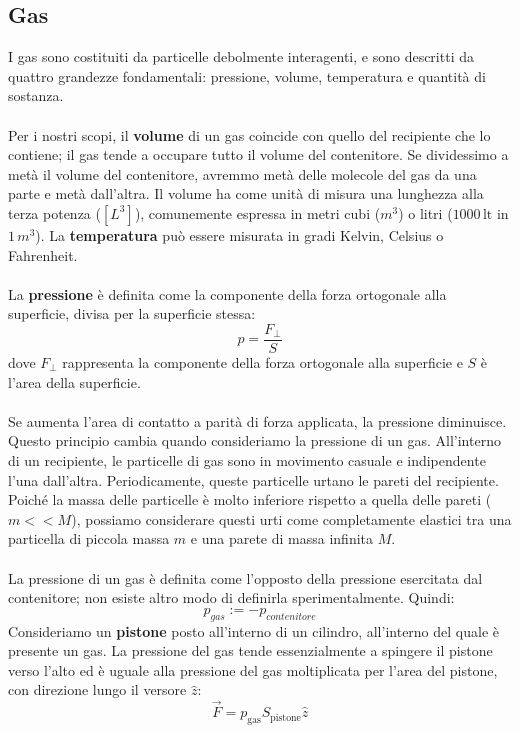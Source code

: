 \documentclass{article}
\begin{document}
\subsection{Gas}
I gas sono costituiti da particelle debolmente interagenti, e sono descritti da quattro grandezze fondamentali: pressione, volume, temperatura e quantità di sostanza.\\
\\
Per i nostri scopi, il \textbf{volume} di un gas coincide con quello del recipiente che lo contiene; il gas tende a occupare tutto il volume del contenitore. Se dividessimo a metà il volume del contenitore, avremmo metà delle molecole del gas da una parte e metà dall'altra. Il volume ha come unità di misura una lunghezza alla terza potenza (\([L^3]\)), comunemente espressa in metri cubi (\(m^3\)) o litri (\(1000 \, \text{lt}\) in \(1 \, m^3\)).
\newpage
\noindent La \textbf{temperatura} può essere misurata in gradi Kelvin, Celsius o Fahrenheit.\\
\\
La \textbf{pressione} è definita come la componente della forza ortogonale alla superficie, divisa per la superficie stessa:
\[
    p = \frac{F_{\bot}}{S}
\] 
dove \(F_{\bot}\) rappresenta la componente della forza ortogonale alla superficie e \(S\) è l'area della superficie.\\
\\
Se aumenta l'area di contatto a parità di forza applicata, la pressione diminuisce. Questo principio cambia quando consideriamo la pressione di un gas. All'interno di un recipiente, le particelle di gas sono in movimento casuale e indipendente l'una dall'altra. Periodicamente, queste particelle urtano le pareti del recipiente. Poiché la massa delle particelle è molto inferiore rispetto a quella delle pareti (\( m << M \)), possiamo considerare questi urti come completamente elastici tra una particella di piccola massa \( m \) e una parete di massa infinita \( M \).\\
\\
La pressione di un gas è definita come l'opposto della pressione esercitata dal contenitore; non esiste altro modo di definirla sperimentalmente. Quindi:
\[
    p_{gas} := -p_{contenitore}
\]
Consideriamo un \textbf{pistone} posto all'interno di un cilindro, all'interno del quale è presente un gas. La pressione del gas tende essenzialmente a spingere il pistone verso l'alto ed è uguale alla pressione del gas moltiplicata per l'area del pistone, con direzione lungo il versore \( \hat{z} \):
\[
    \Vec{F} = p_{\text{gas}} S_{\text{pistone}} \hat{z}
\]
\end{document}
